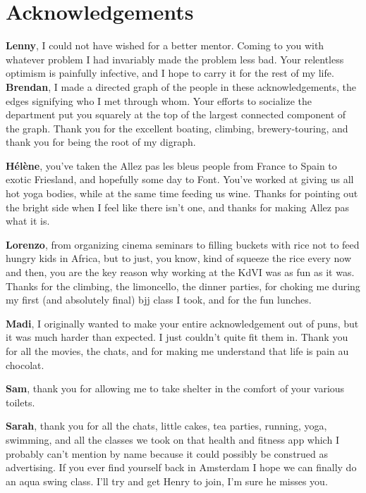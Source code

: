 \chapter*{Acknowledgements}
{\bfseries Lenny}, I could not have wished for a better mentor. Coming to you with whatever problem I had invariably made the problem less bad. Your relentless optimism is painfully infective, and I hope to carry it for the rest of my life. \\

{\bfseries Brendan}, I made a directed graph of the people in these acknowledgements, the edges signifying who I met through whom. Your efforts to socialize the department put you squarely at the top of the largest connected component of the graph. Thank you for the excellent boating, climbing, brewery-touring, and thank you for being the root of my digraph.

{\bfseries H\'el\`ene}, you've taken the Allez pas les bleus people from France to Spain to exotic Friesland, and hopefully some day to Font. You've worked at giving us all hot yoga bodies, while at the same time feeding us wine. Thanks for pointing out the bright side when I feel like there isn't one, and thanks for making Allez pas what it is.

{\bfseries Lorenzo}, from organizing cinema seminars to filling buckets with rice not to feed hungry kids in Africa, but to just, you know, kind of squeeze the rice every now and then, you are the key reason why working at the KdVI was as fun as it was. Thanks for the climbing, the limoncello, the dinner parties, for choking me during my first (and absolutely final) bjj class I took, and for the fun lunches.

{\bfseries Madi}, I originally wanted to make your entire acknowledgement out of puns, but it was much harder than expected. I just couldn't quite fit them in. Thank you for all the movies, the chats, and for making me understand that life is pain au chocolat.

{\bfseries Sam}, thank you for allowing me to take shelter in the comfort of your various toilets.

{\bfseries Sarah}, thank you for all the chats, little cakes, tea parties, running, yoga, swimming, and all the classes we took on that health and fitness app which I probably can't mention by name because it could possibly be construed as advertising. If you ever find yourself back in Amsterdam I hope we can finally do an aqua swing class. I'll try and get Henry to join, I'm sure he misses you.

